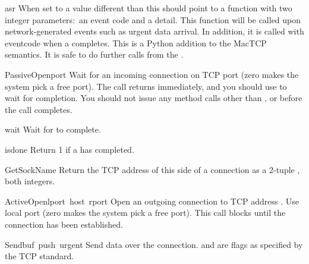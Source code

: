 
\begin{datadesc}{asr}
When set to a value different than  this should point to a
function with two integer parameters:\ an event code and a detail. This
function will be called upon network-generated events such as urgent
data arrival. In addition, it is called with eventcode
 when a  completes. This
is a Python addition to the MacTCP semantics.
It is safe to do further calls from the .
\end{datadesc}


\begin{funcdesc}{PassiveOpen}{port}
Wait for an incoming connection on TCP port  (zero makes the
system pick a free port). The call returns immediately, and you should
use  to wait for completion. You should not issue any method
calls other than
,  or  before the call
completes.
\end{funcdesc}

\begin{funcdesc}{wait}{}
Wait for  to complete.
\end{funcdesc}

\begin{funcdesc}{isdone}{}
Return 1 if a  has completed.
\end{funcdesc}

\begin{funcdesc}{GetSockName}{}
Return the TCP address of this side of a connection as a 2-tuple
, both integers.
\end{funcdesc}

\begin{funcdesc}{ActiveOpen}{lport\, host\, rport}
Open an outgoing connection to TCP address . Use
local port  (zero makes the system pick a free port). This
call blocks until the connection has been established.
\end{funcdesc}

\begin{funcdesc}{Send}{buf\, push\, urgent}
Send data  over the connection.  and 
are flags as specified by the TCP standard.
\end{funcdesc}

